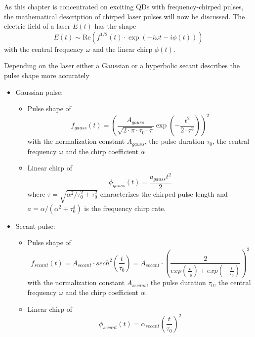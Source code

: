 As this chapter is concentrated on exciting \acp{QD} with frequency-chirped pulses, the mathematical description of chirped laser pulses will now be discussed. The electric field of a laser $E(t)$ has the shape
\begin{equation}
\label{eq:electric-field-laser}
E(t) \sim \mathrm{Re}\left(f^{1/2}(t) \cdot \exp\left(-i \omega t - i \phi(t)\right)\right)
\end{equation}
with the central frequency $\omega$ and the linear chirp $\phi(t)$.

Depending on the laser either a Gaussian or a hyperbolic secant describes the pulse shape more accurately~\cite{glassl_biexciton_2013, hirayama_real-time_2002}

\begin{itemize}
	\item Gaussian pulse:
	\begin{itemize}
		\item Pulse shape of
		\begin{equation}
		\label{eq:f_gauss}
		f_{gauss}(t) = \left(\frac{A_{gauss}}{\sqrt{2 \cdot \pi \cdot \tau_0 \cdot \tau}} \exp\left(-\frac{t^2}{2 \cdot \tau^2}\right)\right)^2
		\end{equation}
		with the normalization constant $A_{gauss}$, the pulse duration $\tau_0$, the central frequency $\omega$ and the chirp coefficient $\alpha$.
		\item Linear chirp of
		\begin{equation}
		\label{eq:phi-gauss}
		\phi_{gauss}(t) = \frac{a_{gauss} t^2}{2}
		\end{equation}
		where $\tau = \sqrt{\alpha^2 / \tau_0^2 + \tau_0^2}$ characterizes the chirped pulse length and $a = \alpha / (\alpha ^ 2 + \tau _0 ^ 4)$ is the frequency chirp rate.
	\end{itemize}
	\item Secant pulse:
	\begin{itemize}
		\item Pulse shape of
		\begin{equation}
		f_{secant}(t) = A_{secant} \cdot sech^2\left(\frac{t}{\tau_0}\right) = A_{secant} \cdot \left(\frac{2}{exp(\frac{t}{\tau_0}) + exp(-\frac{t}{\tau_0})}\right)^2
		\end{equation}
		with the normalization constant $A_{secant}$, the pulse duration $\tau_0$, the central frequency $\omega$ and the chirp coefficient $\alpha$.
		\item Linear chirp of
		\begin{equation}
		\phi_{secant}(t) = \alpha_{secant}\left(\frac{t}{\tau_0}\right)^2
		\end{equation}
	\end{itemize}
\end{itemize}
	
